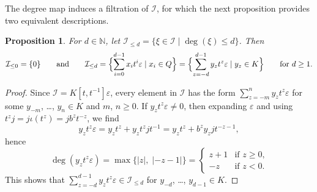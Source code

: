 \documentclass{amsart}
\newcommand{\calI}{\mathcal{I}}
\newtheorem{prop}{Proposition}[section]
\theoremstyle{remark}
\begin{document}
The degree map induces a filtration of $\calI$, for which the next proposition provides two equivalent descriptions. 

\begin{prop}
  \label{prop:degI}
  For $d\in\mathbb{N}$, let $\calI_{\leq d} =
  \{\xi\in\calI\mid 
  \deg(\xi)\leq d\}$. Then
  \[
    \calI_{\leq0}=\{0\} \qquad\text{and}\qquad
    \calI_{\leq d} = \Bigl\{\sum_{i=0}^{d-1}x_it^i\varepsilon \mid
    x_i\in Q\Bigr\}
    =\Bigl\{\sum_{z=-d}^{d-1} y_zt^z\varepsilon \mid
    y_z\in K\Bigr\}\qquad\text{for $d\geq1$.}
  \]
\end{prop}

\begin{proof}
  Since $\calI=K[t,t^{-1}]\varepsilon$, every element in $\calI$ has
  the 
  form $\sum_{z=-m}^ny_zt^z\varepsilon$ for some $y_{-m}$, \ldots,
  $y_n\in K$ and $m$, $n\geq0$.
  If $y_zt^z\varepsilon\neq0$, then expanding $\varepsilon$ and using
  $t^zj = j\iota(t^z) = jb^zt^{-z}$, 
  we find 
  \[
    y_zt^z\varepsilon = y_zt^z +y_zt^zjt^{-1} = y_zt^z +
    b^zy_zjt^{-z-1},
  \]
  hence
  \[
    \deg(y_zt^z\varepsilon) = \max\{\lvert z\rvert,\; \lvert
    -z-1\rvert\}=
    \begin{cases}
      z+1&\text{if $z\geq0$,}\\
      -z&\text{if $z<0$.}
    \end{cases}
  \]
  This shows that $\sum_{z=-d}^{d-1}y_zt^z\varepsilon\in\calI_{\leq
    d}$ for $y_{-d}$, \ldots, $y_{d-1}\in K$.
  

\end{proof}
\end{document}
